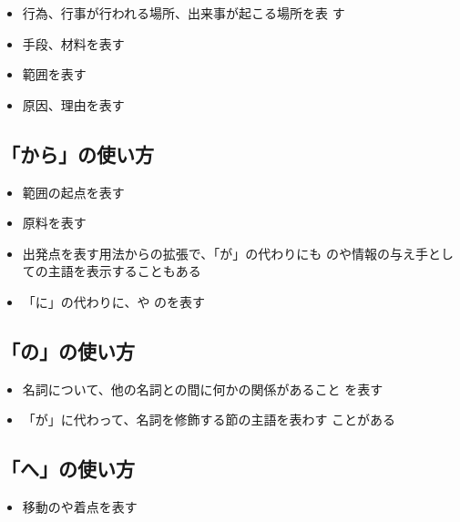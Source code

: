 \documentclass{tufte-handout}
\begin{document}
\begin{itemize}
  \item 行為、行事が行われる場所、出来事が起こる場所を表
    す
  \item 手段、材料を表す
  \item 範囲を表す
  \item 原因、理由を表す
\end{itemize}


\subsection{「から」の使い方}%
\label{sub:kara_notsukaikata}

\begin{itemize}
  \item 範囲の起点を表す
  \item 原料を表す
  \item 出発点を表す用法からの拡張で、「が」の代わりにも
    のや情報の与え手としての主語を表示することもある
  \item 「に」の代わりに、や
    のを表す
\end{itemize}


\subsection{「の」の使い方}%
\label{sub:no_notsukaikata}

\begin{itemize}
  \item 名詞について、他の名詞との間に何かの関係があること
    を表す
  \item 「が」に代わって、名詞を修飾する節の主語を表わす
    ことがある
\end{itemize}


\subsection{「へ」の使い方}%
\label{sub:e_notesukaikata}

\begin{itemize}
  \item 移動のや着点を表す
\end{itemize}
\end{document}
